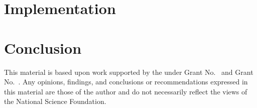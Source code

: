 \documentclass[review, anonymous, sigplan]{acmart}
\begin{document}
\section{Implementation}
\lipsum[1]

\section{Conclusion}
\lipsum[1]

\begin{acks}                            %
  This material is based upon work supported by the
   under Grant
  No.~ and Grant
  No.~.  Any opinions, findings, and
  conclusions or recommendations expressed in this material are those
  of the author and do not necessarily reflect the views of the
  National Science Foundation.
\end{acks}



\appendix
\end{document}
